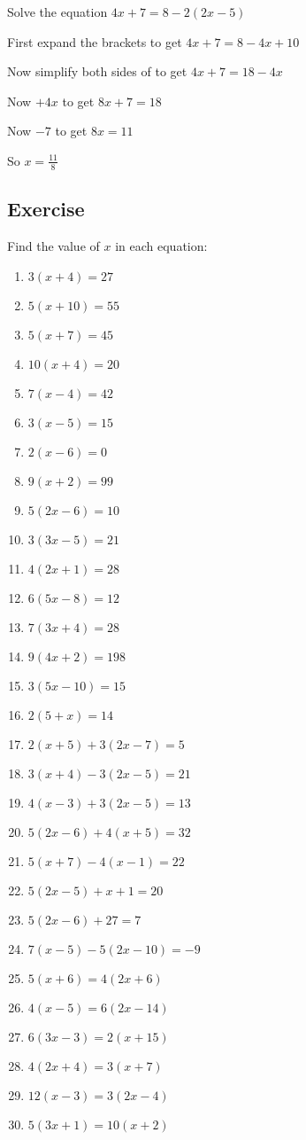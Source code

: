 \begin{exmp}
Solve the equation $4x+7=8-2(2x-5)$

\bigskip

First expand the brackets to get $4x+7=8-4x+10$

\bigskip

Now simplify both sides of to get $4x+7=18-4x$

\bigskip

Now $+4x$ to get $8x+7=18$


\bigskip

Now $-7$ to get $8x=11$

\bigskip

So $\displaystyle x=\frac{11}{8}$
\end{exmp}

\subsection{Exercise}
Find the value of $x$ in each equation:
\begin{multicols}{2}
\begin{enumerate}
	\item $3(x+4)=27$
	\item $5(x+10)=55$
	\item $5(x+7)=45$
	\item $10(x+4)=20$
	\item $7(x-4)=42$
	\item $3(x-5)=15$
	\item $2(x-6)=0$
	\item $9(x+2)=99$
	\item $5(2x-6)=10$
	\item $3(3x-5)=21$
	\item $4(2x+1)=28$
	\item $6(5x-8)=12$
	\item $7(3x+4)=28$
	\item $9(4x+2)=198$
	\item $3(5x-10)=15$
	\item $2(5+x)=14$
	\item $2(x+5)+3(2x-7)=5$
	\item $3(x+4)-3(2x-5)=21$
	\item $4(x-3)+3(2x-5)=13$
	\item $5(2x-6)+4(x+5)=32$
	\item $5(x+7)-4(x-1)=22$
	\item $5(2x-5)+x+1=20$
	\item $5(2x-6)+27=7$
	\item $7(x-5)-5(2x-10)=-9$
	\item $5(x+6)=4(2x+6)$
	\item $4(x-5)=6(2x-14)$
	\item $6(3x-3)=2(x+15)$
	\item $4(2x+4)=3(x+7)$
	\item $12(x-3)=3(2x-4)$
	\item $5(3x+1)=10(x+2)$
\end{enumerate}
\end{multicols}


